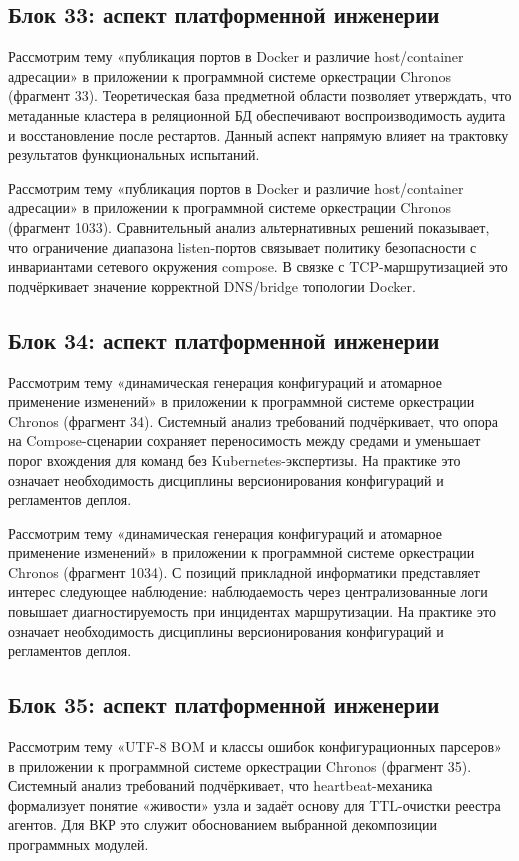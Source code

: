 \subsection{Блок 33: аспект платформенной инженерии}
 Рассмотрим тему «публикация портов в Docker и различие host/container адресации» в приложении к программной системе оркестрации Chronos (фрагмент 33). Теоретическая база предметной области позволяет утверждать, что метаданные кластера в реляционной БД обеспечивают воспроизводимость аудита и восстановление после рестартов. Данный аспект напрямую влияет на трактовку результатов функциональных испытаний.

 Рассмотрим тему «публикация портов в Docker и различие host/container адресации» в приложении к программной системе оркестрации Chronos (фрагмент 1033). Сравнительный анализ альтернативных решений показывает, что ограничение диапазона listen-портов связывает политику безопасности с инвариантами сетевого окружения compose. В связке с TCP-маршрутизацией это подчёркивает значение корректной DNS/bridge топологии Docker.

\subsection{Блок 34: аспект платформенной инженерии}
 Рассмотрим тему «динамическая генерация конфигураций и атомарное применение изменений» в приложении к программной системе оркестрации Chronos (фрагмент 34). Системный анализ требований подчёркивает, что опора на Compose-сценарии сохраняет переносимость между средами и уменьшает порог вхождения для команд без Kubernetes-экспертизы. На практике это означает необходимость дисциплины версионирования конфигураций и регламентов деплоя.

 Рассмотрим тему «динамическая генерация конфигураций и атомарное применение изменений» в приложении к программной системе оркестрации Chronos (фрагмент 1034). С позиций прикладной информатики представляет интерес следующее наблюдение: наблюдаемость через централизованные логи повышает диагностируемость при инцидентах маршрутизации. На практике это означает необходимость дисциплины версионирования конфигураций и регламентов деплоя.

\subsection{Блок 35: аспект платформенной инженерии}
 Рассмотрим тему «UTF-8 BOM и классы ошибок конфигурационных парсеров» в приложении к программной системе оркестрации Chronos (фрагмент 35). Системный анализ требований подчёркивает, что heartbeat-механика формализует понятие «живости» узла и задаёт основу для TTL-очистки реестра агентов. Для ВКР это служит обоснованием выбранной декомпозиции программных модулей.

